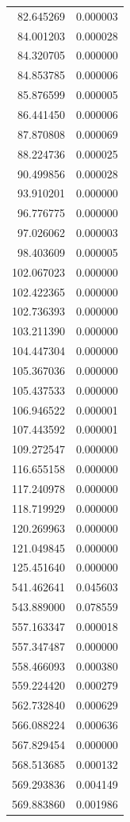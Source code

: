 \begin{longtable}{rr}
82.645269 & 0.000003 \\
84.001203 & 0.000028 \\
84.320705 & 0.000000 \\
84.853785 & 0.000006 \\
85.876599 & 0.000005 \\
86.441450 & 0.000006 \\
87.870808 & 0.000069 \\
88.224736 & 0.000025 \\
90.499856 & 0.000028 \\
93.910201 & 0.000000 \\
96.776775 & 0.000000 \\
97.026062 & 0.000003 \\
98.403609 & 0.000005 \\
102.067023 & 0.000000 \\
102.422365 & 0.000000 \\
102.736393 & 0.000000 \\
103.211390 & 0.000000 \\
104.447304 & 0.000000 \\
105.367036 & 0.000000 \\
105.437533 & 0.000000 \\
106.946522 & 0.000001 \\
107.443592 & 0.000001 \\
109.272547 & 0.000000 \\
116.655158 & 0.000000 \\
117.240978 & 0.000000 \\
118.719929 & 0.000000 \\
120.269963 & 0.000000 \\
121.049845 & 0.000000 \\
125.451640 & 0.000000 \\
541.462641 & 0.045603 \\
543.889000 & 0.078559 \\
557.163347 & 0.000018 \\
557.347487 & 0.000000 \\
558.466093 & 0.000380 \\
559.224420 & 0.000279 \\
562.732840 & 0.000629 \\
566.088224 & 0.000636 \\
567.829454 & 0.000000 \\
568.513685 & 0.000132 \\
569.293836 & 0.004149 \\
569.883860 & 0.001986 \\

\end{longtable}
